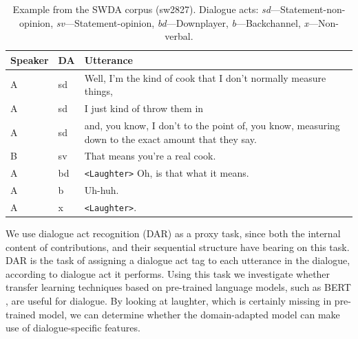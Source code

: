 \documentclass[11pt,a4paper]{article}
\begin{document}
\begin{table}
      \small
  \centering
  \begin{tabularx}{\linewidth}{llL}
    \toprule
    Speaker & DA & Utterance \\ \midrule
    A	&sd	& Well, I'm the kind of cook that I don't normally measure things,  \\
    A	&sd	& I just kind of throw them in \\
    A	&sd	& and, you know, I don't to the point of, you know, measuring down to the exact amount that they say.  \\
    B	&sv	& That means you're a real cook. \\
    A	&bd	& \texttt{<Laughter>} Oh, is that what it means.  \\
    A	&b	& Uh-huh.  \\
    A	&x	& \texttt{<Laughter>}.\\
             \bottomrule
  \end{tabularx}
  \caption{Example from the SWDA corpus (sw2827). Dialogue acts: \emph{sd}---Statement-non-opinion, \emph{sv}---Statement-opinion, \emph{bd}---Downplayer, \emph{b}---Backchannel, \emph{x}---Non-verbal. }
  \label{table:example}
\end{table}

We use dialogue act recognition (DAR) as a proxy task, since both the internal content of contributions, and their sequential structure have bearing on this task. DAR is the task of assigning a dialogue act tag to each utterance in the dialogue, according to dialogue act it performs.
Using this task we investigate whether transfer learning techniques based on pre-trained language models, such as BERT \citep{devlinBERTPretrainingDeep2018}, are useful for dialogue.
By looking at laughter, which is certainly missing in pre-trained model, we can determine whether the domain-adapted model can make use of dialogue-specific features.
\end{document}
